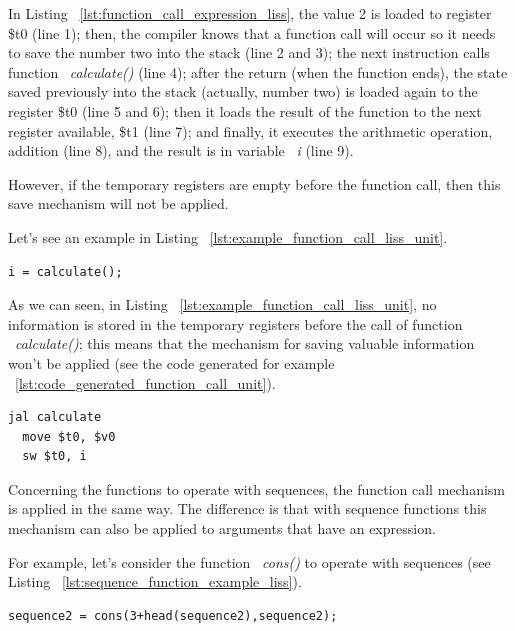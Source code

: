 \documentclass[
  oneside,
  11pt, a4paper,
  footinclude=true,
  headinclude=true,
  cleardoublepage=empty
]{scrbook}
\begin{document}
In Listing ~\ref{lst:function_call_expression_liss}, the value 2 is loaded to register \$t0 (line 1); then, the compiler knows that a function call will occur so it needs to save the number two into the stack (line 2 and 3); the next instruction calls function ~\textit{calculate()} (line 4); after the return (when the function ends), the state saved previously into the stack (actually, number two) is loaded again to the register \$t0 (line 5 and 6); then it loads the result of the function to the next register available, \$t1 (line 7); and finally, it executes the arithmetic operation, addition (line 8), and the result is in variable ~\textit{i} (line 9).

However, if the temporary registers are empty before the function call, then this save mechanism will not be applied.

Let's see an example in Listing ~\ref{lst:example_function_call_liss_unit}.

\begin{lstlisting}[caption={Example of a function call in an assignment},label={lst:example_function_call_liss_unit}]
  i = calculate();
\end{lstlisting}

As we can seen, in Listing ~\ref{lst:example_function_call_liss_unit}, no information is stored in the temporary registers before the call of function ~\textit{calculate()}; this means that the mechanism for saving valuable information won't be applied (see the code generated for example ~\ref{lst:code_generated_function_call_unit}).

\begin{lstlisting}[caption={Code generated for Listing ~\ref{lst:code_generated_function_call_unit}},label={lst:code_generated_function_call_unit}]
  jal calculate		
  move $t0, $v0		
  sw $t0, i	
\end{lstlisting}

Concerning the functions to operate with sequences, the function call mechanism is applied in the same way.
The difference is that with sequence functions this mechanism can also be applied to arguments that have an expression.

For example, let's consider the function ~\textit{cons()} to operate with sequences (see Listing ~\ref{lst:sequence_function_example_liss}).

\begin{lstlisting}[caption={Example of using a sequence function in LISS},label={lst:sequence_function_example_liss}]
  sequence2 = cons(3+head(sequence2),sequence2);
\end{lstlisting}
\end{document}
